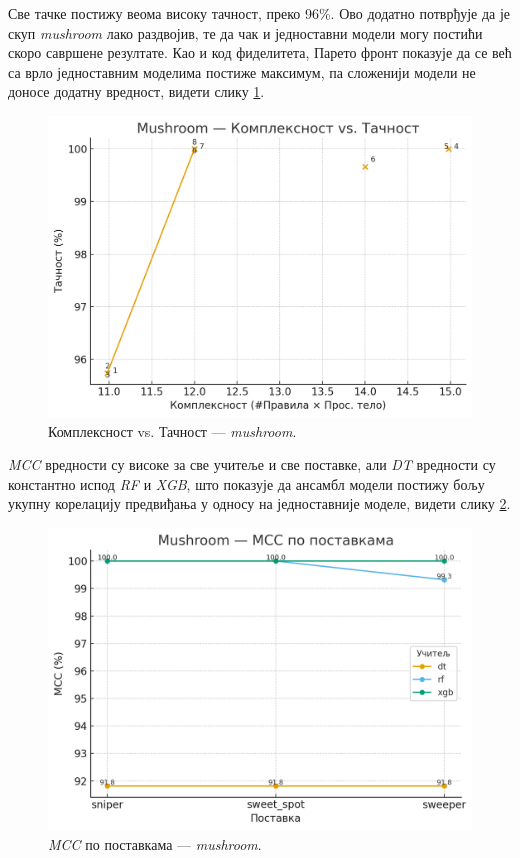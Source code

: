 Све тачке постижу веома високу тачност, преко 96\%. Ово додатно потврђује да је скуп \textit{mushroom} лако раздвојив, те да чак и једноставни модели могу постићи скоро савршене резултате. Као и код фиделитета, Парето фронт показује да се већ са врло једноставним моделима постиже максимум, па сложенији модели не доносе додатну вредност, видети слику \ref{fig:mush-complexity-accuracy}.
\begin{figure}[H]
  \centering
  \includegraphics[width=.85\linewidth]{images/charts/mushroom-kompleksnost-tacnost.png}
  \caption{Комплексност vs. Тачност — \textit{mushroom}.}
  \label{fig:mush-complexity-accuracy}
\end{figure}

\textit{MCC} вредности су високе за све учитеље и све поставке, али \textit{DT} вредности су константно испод \textit{RF} и \textit{XGB}, што показује да ансамбл модели постижу бољу укупну корелацију предвиђања у односу на једноставније моделе, видети слику \ref{fig:mush-mcc}.
\begin{figure}[H]
  \centering
  \includegraphics[width=.85\linewidth]{images/charts/mushroom-mcc.png}
  \caption{\textit{MCC} по поставкама — \textit{mushroom}.}
  \label{fig:mush-mcc}
\end{figure}


